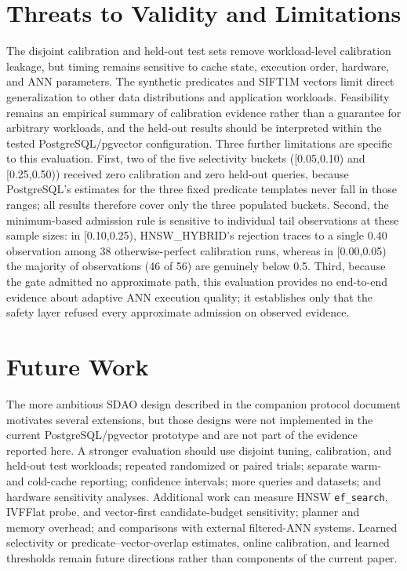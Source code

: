 \documentclass[conference]{IEEEtran}
\begin{document}
\section{Threats to Validity and Limitations}\label{sec:limitations}
The disjoint calibration and held-out test sets remove workload-level calibration leakage, but timing remains sensitive to cache state, execution order, hardware, and ANN parameters. The synthetic predicates and SIFT1M vectors limit direct generalization to other data distributions and application workloads. Feasibility remains an empirical summary of calibration evidence rather than a guarantee for arbitrary workloads, and the held-out results should be interpreted within the tested PostgreSQL/pgvector configuration. Three further limitations are specific to this evaluation. First, two of the five selectivity buckets ([0.05,0.10) and [0.25,0.50)) received zero calibration and zero held-out queries, because PostgreSQL's estimates for the three fixed predicate templates never fall in those ranges; all results therefore cover only the three populated buckets. Second, the minimum-based admission rule is sensitive to individual tail observations at these sample sizes: in [0.10,0.25), HNSW\_HYBRID's rejection traces to a single 0.40 observation among 38 otherwise-perfect calibration runs, whereas in [0.00,0.05) the majority of observations (46 of 56) are genuinely below 0.5. Third, because the gate admitted no approximate path, this evaluation provides no end-to-end evidence about adaptive ANN execution quality; it establishes only that the safety layer refused every approximate admission on observed evidence.

\section{Future Work}
The more ambitious SDAO design described in the companion protocol document motivates several extensions, but those designs were not implemented in the current PostgreSQL/pgvector prototype and are not part of the evidence reported here. A stronger evaluation should use disjoint tuning, calibration, and held-out test workloads; repeated randomized or paired trials; separate warm- and cold-cache reporting; confidence intervals; more queries and datasets; and hardware sensitivity analyses. Additional work can measure HNSW \texttt{ef\_search}, IVFFlat probe, and vector-first candidate-budget sensitivity; planner and memory overhead; and comparisons with external filtered-ANN systems. Learned selectivity or predicate--vector-overlap estimates, online calibration, and learned thresholds remain future directions rather than components of the current paper.
\end{document}
